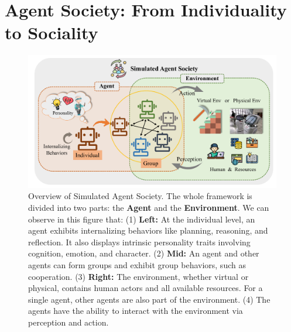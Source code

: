 \section{Agent Society: From Individuality to Sociality}\label{sec:Agent Society}

\begin{figure}[t]
    \centering
    \includegraphics[width=1\textwidth]{figures/sec5_agent_society.pdf}
    \caption{Overview of Simulated Agent Society.
    The whole framework is divided into two parts: the \textbf{Agent} and the \textbf{Environment}.
    We can observe in this figure that: (1) \textbf{Left:} At the individual level, an agent exhibits internalizing behaviors like planning, reasoning, and reflection. It also displays intrinsic personality traits involving cognition, emotion, and character. (2) \textbf{Mid:} An agent and other agents can form groups and exhibit group behaviors, such as cooperation. (3) \textbf{Right:} The environment, whether virtual or physical, contains human actors and all available resources. For a single agent, other agents are also part of the environment. (4) The agents have the ability to interact with the environment via perception and action.
    }
    \label{fig: agent_society}
\end{figure} 

% 

